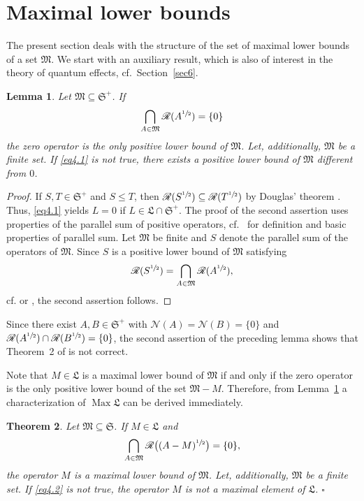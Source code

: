 \documentclass[12pt, a4paper, reqno, twoside]{amsart}
\numberwithin{equation}{section}
\DeclareMathOperator{\Max}{Max}
\newcommand{\frakS}{\mathfrak S}
\newcommand{\frakL}{\mathfrak L}
\newcommand{\frakM}{\mathfrak M}
\newcommand{\cf}{\mbox{cf.}\xspace}
\newcommand{\MYQED}{$\square$}
\newtheorem{theorem}{Theorem}[section]
\newtheorem{lemma}[theorem]{Lemma}
\theoremstyle{definition}
\theoremstyle{remark}
\theoremstyle{mystyle}
\begin{document}
\section{Maximal lower bounds}
\label{sec4}

The present section deals with the structure of the set of maximal
lower bounds of a set $\frakM$. We start with an auxiliary result,
which is also of interest in the theory of quantum effects, cf.\
Section~\ref{sec6}.
\begin{lemma}
\label{lem4.1}
Let $\frakM\subseteq\frakS^{+}$. If
\begin{equation}
\label{eq4.1}
\bigcap_{A\in\frakM} {\mathscr R}(A^{\sfrac{1}{2}}) = \{0\}  
\end{equation}
the zero operator is the only positive lower bound of $\frakM$. Let,
additionally, $\frakM$ be a finite set. If \eqref{eq4.1} is not true,
there exists a positive lower bound of $\frakM$ different from $0$.
\end{lemma}

\begin{proof}
If $S,T\in\frakS^{+}$ and $S\leq T$, then
$\mathscr R(S^{\sfrac{1}{2}})\subseteq\mathscr R(T^{\sfrac{1}{2}})$ by
Douglas' theorem \cite{Douglas1966}. Thus, \eqref{eq4.1} yields $L=0$ if
$L\in\frakL\cap\frakS^{+}$. The proof of the second assertion uses
properties of the parallel sum of positive operators, cf.\
\cite{AndersonTrapp1975,FillmoreWilliams1971,PekarevSmuljan1976} for
definition  and basic properties of parallel sum. Let $\frakM$ be
finite and $S$ denote the parallel sum of  the operators of $\frakM$.
Since $S$ is a positive lower bound of $\frakM$ satisfying
\[
  \mathscr R(S^{\sfrac{1}{2}}) =
  \bigcap_{A\in\frakM}\mathscr R(A^{\sfrac{1}{2}}), 
\]
\cf \cite[Thm.~4.2]{FillmoreWilliams1971} or
\cite[Thms.~10, 11]{AndersonTrapp1975}, the second assertion follows.
\end{proof}

Since there exist $A,B\in\frakS^{+}$ with
$\mathscr N(A)=\mathscr N(B) =\{0\}$ and
$\mathscr R(A^{\sfrac{1}{2}})\cap \mathscr R(B^{\sfrac{1}{2}})=\{0\}$, 
the second assertion of the preceding lemma shows that Theorem~2 of
\cite{Aslanov2005} is not correct.

Note that $M\in\frakL$ is a maximal lower bound of $\frakM$ if and
only if the zero operator is the only positive lower bound of the set
$\frakM-M$. Therefore, from Lemma~\ref{lem4.1} a characterization of
$\Max\frakL$ can be derived immediately.

\begin{theorem}
\label{thm4.2}
Let $\frakM\subseteq\frakS$. If $M\in\frakL$ and
\begin{equation}
\label{eq4.2}
\bigcap_{A\in\frakM} \mathscr R\bigl((A-M)^{\sfrac{1}{2}}\bigr)=\{0\},
\end{equation}
the operator $M$ is a maximal lower bound of $\frakM$. Let,
additionally, $\frakM$ be a finite set. If \eqref{eq4.2} is not true,
the operator $M$ is not a maximal element of $\frakL$.
\hfill\MYQED
\end{theorem}
\end{document}

